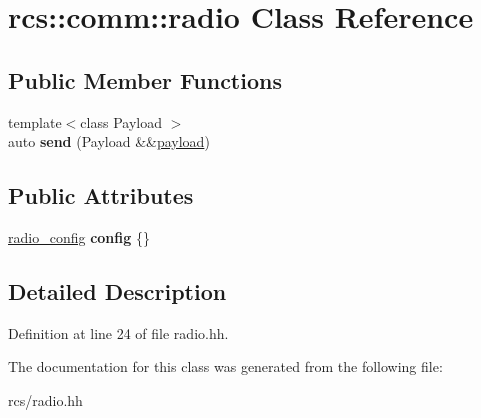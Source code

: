 \hypertarget{classrcs_1_1comm_1_1radio}{}\section{rcs\+:\+:comm\+:\+:radio Class Reference}
\label{classrcs_1_1comm_1_1radio}
\subsection*{Public Member Functions}
\begin{DoxyCompactItemize}
\item 
\mbox{\label{classrcs_1_1comm_1_1radio_a6a2479c275480868afe194785345f2a3}} 
{\footnotesize template$<$class Payload $>$ }\\auto {\bfseries send} (Payload \&\&\mbox{\hyperlink{structrcs_1_1comm_1_1payload}{payload}})
\end{DoxyCompactItemize}
\subsection*{Public Attributes}
\begin{DoxyCompactItemize}
\item 
\mbox{\label{classrcs_1_1comm_1_1radio_afe0d5767492ad06d26ef504b231c629d}} 
\mbox{\hyperlink{structrcs_1_1comm_1_1radio__config}{radio\+\_\+config}} {\bfseries config} \{\}
\end{DoxyCompactItemize}


\subsection{Detailed Description}


Definition at line 24 of file radio.\+hh.



The documentation for this class was generated from the following file\+:\begin{DoxyCompactItemize}
\item 
rcs/radio.\+hh\end{DoxyCompactItemize}
